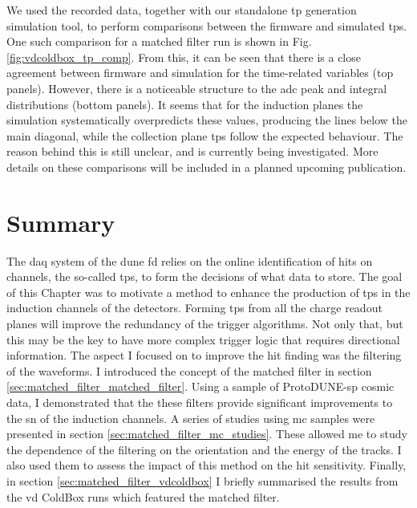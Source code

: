 We used the recorded data, together with our standalone \gls{tp} generation simulation tool, to perform comparisons between the firmware and simulated \gls{tp}s. One such comparison for a matched filter run is shown in Fig. \ref{fig:vdcoldbox_tp_comp}. From this, it can be seen that there is a close agreement between firmware and simulation for the time-related variables (top panels). However, there is a noticeable structure to the \gls{adc} peak and integral distributions (bottom panels). It seems that for the induction planes the simulation systematically overpredicts these values, producing the lines below the main diagonal, while the collection plane \gls{tp}s follow the expected behaviour. The reason behind this is still unclear, and is currently being investigated. More details on these comparisons will be included in a planned upcoming publication.

\section{Summary}

The \gls{daq} system of the \gls{dune} \gls{fd} relies on the online identification of hits on channels, the so-called \gls{tp}s, to form the decisions of what data to store. The goal of this Chapter was to motivate a method to enhance the production of \gls{tp}s in the induction channels of the detectors. Forming \gls{tp}s from all the charge readout planes will improve the redundancy of the trigger algorithms. Not only that, but this may be the key to have more complex trigger logic that requires directional information. The aspect I focused on to improve the hit finding was the filtering of the waveforms. I introduced the concept of the matched filter in section \ref{sec:matched_filter_matched_filter}. Using a sample of ProtoDUNE-\gls{sp} cosmic data, I demonstrated that the these filters provide significant improvements to the \gls{sn} of the induction channels. A series of studies using \gls{mc} samples were presented in section \ref{sec:matched_filter_mc_studies}. These allowed me to study the dependence of the filtering on the orientation and the energy of the tracks. I also used them to assess the impact of this method on the hit sensitivity. Finally, in section \ref{sec:matched_filter_vdcoldbox} I briefly summarised the results from the \gls{vd} ColdBox runs which featured the matched filter.

